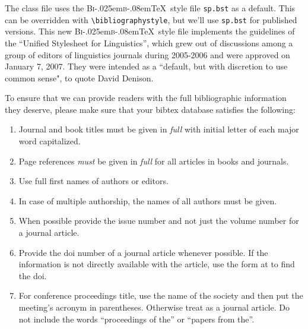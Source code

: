 \documentclass[lucida,final]{sp}
\newcommand{\BibTeX}{B{\textsc i\kern-.025em\textsc b}\kern-.08em\TeX}
\newcommand{\spfile}[1]{\texttt{#1}}
\newcommand{\cmd}[1]{\texttt{\textbackslash#1}}
\begin{document}
The class file uses the \BibTeX\ style file \spfile{sp.bst} as a
default.  This can be overridden with \cmd{bibliographystyle}, but
we'll use \spfile{sp.bst} for published versions. This new \BibTeX\
style file implements the guidelines of the ``Unified Stylesheet for
Linguistics'', which grew out of discussions among a group of editors
of linguistics journals during 2005-2006 and were approved on January
7, 2007. They were intended as a ``default, but with discretion to use
common sense", to quote David Denison.

To ensure that we can provide readers with the full bibliographic
information they deserve, please make sure that your bibtex database
satisfies the following:

\begin{enumerate}
\item Journal and book titles must be given in \emph{full} with initial
    letter of each major word capitalized.
\item Page references \emph{must} be given in \emph{full} for all
  articles in books and journals.
\item Use full first names of authors or editors.
\item In case of multiple authorship, the names of all authors must be
  given.
\item When possible provide the issue number and not just the volume
  number for a journal article.
\item Provide the doi number of a journal article whenever
  possible. If the information is not directly available with the
  article, use the form at
   to find the doi.
\item For conference proceedings title, use the name of the society
      and then put the meeting's acronym in parentheses. Otherwise treat
      as a journal article. Do not include the words ``proceedings of
      the'' or ``papers from the''.  
      
\end{enumerate}
\end{document}
